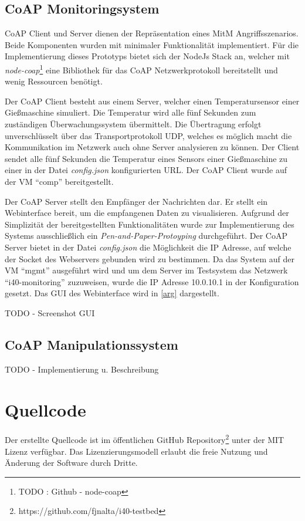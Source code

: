 \subsection{\ac{CoAP} Monitoringsystem}
\ac{CoAP} Client und Server dienen der Repräsentation eines \ac{MitM} Angriffsszenarios. Beide Komponenten wurden mit minimaler Funktionalität implementiert. Für die Implementierung dieses Prototyps bietet sich der NodeJs Stack an, welcher mit \textit{node-coap}\footnote{TODO : Github - node-coap} eine Bibliothek für das \ac{CoAP} Netzwerkprotokoll bereitstellt und wenig Ressourcen benötigt.

Der \ac{CoAP} Client besteht aus einem Server, welcher einen Temperatursensor einer Gießmaschine simuliert. Die Temperatur wird alle fünf Sekunden zum zuständigen Überwachungssystem übermittelt. Die Übertragung erfolgt unverschlüsselt über das Transportprotokoll \ac{UDP}, welches es möglich macht die Kommunikation im Netzwerk auch ohne Server analysieren zu können. Der Client sendet alle fünf Sekunden die Temperatur eines Sensors einer Gießmaschine zu einer in der Datei \textit{config.json} konfigurierten \ac{URL}. Der \ac{CoAP} Client wurde auf der \ac{VM} "`comp"' bereitgestellt.

Der \ac{CoAP} Server stellt den Empfänger der Nachrichten dar. Er stellt ein Webinterface bereit, um die empfangenen Daten zu visualisieren. Aufgrund der Simplizität der bereitgestellten Funktionalitäten wurde zur Implementierung des Systems ausschließlich ein \textit{Pen-and-Paper-Protoyping} durchgeführt. Der \ac{CoAP} Server bietet in der Datei \textit{config.json} die Möglichkeit die \ac{IP} Adresse, auf welche der Socket des Webservers gebunden wird zu bestimmen. Da das System auf der \ac{VM} "`mgmt"' ausgeführt wird und um dem Server im Testsystem das Netzwerk "`i40-monitoring"' zuzuweisen, wurde die \ac{IP} Adresse 10.0.10.1 in der Konfiguration gesetzt. Das \ac{GUI} des Webinterface wird in \autoref{arg} dargestellt.

TODO - Screenshot GUI

\subsection{\ac{CoAP} Manipulationssystem}
TODO - Implementierung u. Beschreibung

\section{Quellcode}
Der erstellte Quellcode ist im öffentlichen GitHub Repository\footnote{https://github.com/fjnalta/i40-testbed} unter der \ac{MIT} Lizenz verfügbar. Das Lizenzierungsmodell erlaubt die freie Nutzung und Änderung der Software durch Dritte.


